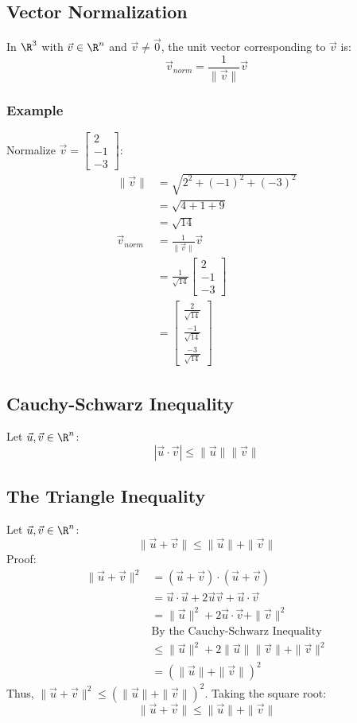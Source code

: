 \documentclass{math}
\begin{document}
\subsection*{Vector Normalization}
In \( \R^3 \) with \( \vec{v}\in\R^n \) and \( \vec{v}\neq\vec{0} \), the
unit vector corresponding to \( \vec{v} \) is:
\[ \vec{v}_{norm} = \frac{1}{\|\vec{v}\|}\vec{v} \]

\subsubsection*{Example}
Normalize \( \vec{v} = \begin{bmatrix}2 \\ -1 \\ -3\end{bmatrix} \):
\begin{align*}
  \|\vec{v}\| &= \sqrt{2^2+(-1)^2+(-3)^2} \\
  &= \sqrt{4+1+9} \\
  &= \sqrt{14} \\
  \vec{v}_{norm} &= \frac{1}{\|\vec{v}\|}\vec{v} \\
  &= \frac{1}{\sqrt{14}}\begin{bmatrix}2 \\ -1 \\ -3\end{bmatrix} \\
  &= \begin{bmatrix}
    \frac{2}{\sqrt{14}} \\
    \frac{-1}{\sqrt{14}} \\
    \frac{-3}{\sqrt{14}}
  \end{bmatrix}
\end{align*}

\subsection*{Cauchy-Schwarz Inequality}
Let \( \vec{u},\vec{v}\in\R^n \):
\[ |\vec{u}\cdot\vec{v}|\leq\|\vec{u}\|\|\vec{v}\| \]

\subsection*{The Triangle Inequality}
Let \( \vec{u},\vec{v}\in\R^n \):
\[ \|\vec{u}+\vec{v}\|\leq\|\vec{u}\|+\|\vec{v}\| \]
Proof:
\begin{align*}
  \|\vec{u}+\vec{v}\|^2 &= (\vec{u}+\vec{v})\cdot(\vec{u}+\vec{v}) \\
  &= \vec{u}\cdot\vec{u}+2\vec{u}\vec{v}+\vec{u}\cdot\vec{v} \\
  &= \|\vec{u}\|^2+2\vec{u}\cdot\vec{v}+\|\vec{v}\|^2 \\
  & \textrm{By the Cauchy-Schwarz Inequality} \\
  &\leq \|\vec{u}\|^2+2\|\vec{u}\|\|\vec{v}\|+\|\vec{v}\|^2 \\
  &= (\|\vec{u}\|+\|\vec{v}\|)^2
\end{align*}
Thus, \( \|\vec{u}+\vec{v}\|^2 \leq (\|\vec{u}\|+\|\vec{v}\|)^2 \). Taking the
square root:
\[ \|\vec{u}+\vec{v}\|\leq\|\vec{u}\|+\|\vec{v}\| \]
\end{document}
